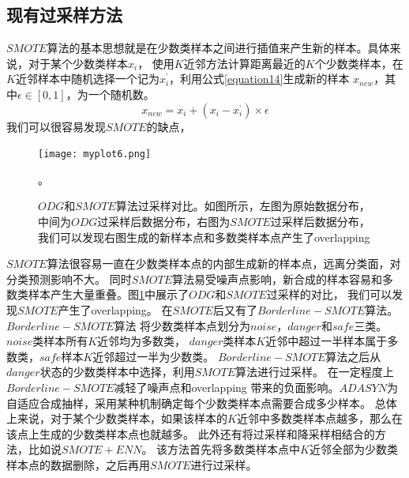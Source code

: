 \documentclass{article}
\begin{document}
\subsection{现有过采样方法}
$SMOTE$算法的基本思想就是在少数类样本之间进行插值来产生新的样本。具体来说，对于某个少数类样本$x_i$，
使用$K$近邻方法计算距离最近的$K$个少数类样本，在$K$近邻样本中随机选择一个记为$x_i^{’}$，利用公式\ref{equation14}生成新的样本
$x_{new}$，其中$\epsilon\in [0,1]$，为一个随机数。
\begin{equation}
  \label{equation14}
  x_{new}=x_i+(x_i-x_i^{‘})\times \epsilon
\end{equation}
我们可以很容易发现$SMOTE$的缺点，
\begin{figure}
  \centering
  \texttt{[image: myplot6.png]}
  \caption{$ODG$和$SMOTE$算法过采样对比。如图所示，左图为原始数据分布，中间为$ODG$过采样后数据分布，右图为$SMOTE$过采样后数据分布，
  我们可以发现右图生成的新样本点和多数类样本点产生了overlapping}。
  \label{fig6}
\end{figure}
$SMOTE$算法很容易一直在少数类样本点的内部生成新的样本点，远离分类面，对分类预测影响不大。
同时$SMOTE$算法易受噪声点影响，新合成的样本容易和多数类样本产生大量重叠。图\ref{fig6}中展示了$ODG$和$SMOTE$过采样的对比，
我们可以发现$SMOTE$产生了overlapping。
在$SMOTE$后又有了$Borderline-SMOTE$算法。$Borderline-SMOTE$算法
将少数类样本点划分为$noise$，$danger$和$safe$三类。$noise$类样本所有$K$近邻均为多数类，
$danger$类样本$K$近邻中超过一半样本属于多数类，$safe$样本$K$近邻超过一半为少数类。
$Borderline-SMOTE$算法之后从$danger$状态的少数类样本中选择，利用$SMOTE$算法进行过采样。
在一定程度上$Borderline-SMOTE$减轻了噪声点和overlapping
带来的负面影响。$ADASYN$为自适应合成抽样，采用某种机制确定每个少数类样本点需要合成多少样本。
总体上来说，对于某个少数类样本，如果该样本的$K$近邻中多数类样本点越多，那么在该点上生成的少数类样本点也就越多。
此外还有将过采样和降采样相结合的方法，比如说$SMOTE+ENN$\cite{2019Electrocardiogram}。
该方法首先将多数类样本点中$K$近邻全部为少数类样本点的数据删除，之后再用$SMOTE$进行过采样。
\end{document}
